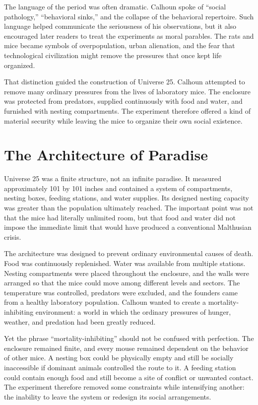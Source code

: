 ﻿\documentclass[12pt,a4paper]{book}
\begin{document}
The language of the period was often dramatic. Calhoun spoke of ``social pathology,'' ``behavioral sinks,'' and the collapse of the behavioral repertoire. Such language helped communicate the seriousness of his observations, but it also encouraged later readers to treat the experiments as moral parables. The rats and mice became symbols of overpopulation, urban alienation, and the fear that technological civilization might remove the pressures that once kept life organized.

That distinction guided the construction of Universe 25. Calhoun attempted to remove many ordinary pressures from the lives of laboratory mice. The enclosure was protected from predators, supplied continuously with food and water, and furnished with nesting compartments. The experiment therefore offered a kind of material security while leaving the mice to organize their own social existence.

\section{The Architecture of Paradise}

Universe 25 was a finite structure, not an infinite paradise. It measured approximately 101 by 101 inches and contained a system of compartments, nesting boxes, feeding stations, and water supplies. Its designed nesting capacity was greater than the population ultimately reached. The important point was not that the mice had literally unlimited room, but that food and water did not impose the immediate limit that would have produced a conventional Malthusian crisis.

The architecture was designed to prevent ordinary environmental causes of death. Food was continuously replenished. Water was available from multiple stations. Nesting compartments were placed throughout the enclosure, and the walls were arranged so that the mice could move among different levels and sectors. The temperature was controlled, predators were excluded, and the founders came from a healthy laboratory population. Calhoun wanted to create a mortality-inhibiting environment: a world in which the ordinary pressures of hunger, weather, and predation had been greatly reduced.

Yet the phrase ``mortality-inhibiting'' should not be confused with perfection. The enclosure remained finite, and every mouse remained dependent on the behavior of other mice. A nesting box could be physically empty and still be socially inaccessible if dominant animals controlled the route to it. A feeding station could contain enough food and still become a site of conflict or unwanted contact. The experiment therefore removed some constraints while intensifying another: the inability to leave the system or redesign its social arrangements.
\end{document}
